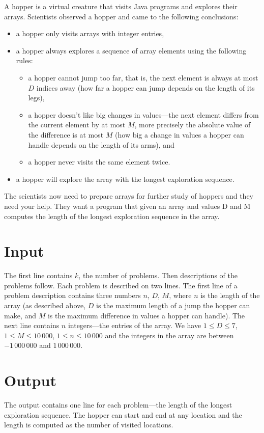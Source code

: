 
A hopper is a virtual creature that visits Java programs and explores their arrays. Scientists
observed a hopper and came to the following conclusions:
\begin{itemize}
\item a hopper only visits arrays with integer entries, 
\item a hopper always explores a sequence of array elements using the
  following rules:
  \begin{itemize}
  \item a hopper cannot jump too far, that is, the next element is
    always at most $D$ indices away (how far a hopper can jump depends
    on the length of its legs),
  \item a hopper doesn’t like big changes in values---the next element
    differs from the current element by at most $M$, more precisely
    the absolute value of the difference is at most $M$ (how big a
    change in values a hopper can handle depends on the length of its
    arms), and
  \item a hopper never visits the same element twice.
  \end{itemize}
\item a hopper will explore the array with the longest exploration
  sequence.
\end{itemize}
The scientists now need to prepare arrays for further study of hoppers and they need your
help. They want a program that given an array and values D and M computes the length
of the longest exploration sequence in the array.

\section*{Input}

The first line contains $k$, the number of problems. Then descriptions
of the problems follow.  Each problem is described on two lines. The
first line of a problem description contains three numbers $n$, $D$,
$M$, where $n$ is the length of the array (as described above, $D$ is
the maximum length of a jump the hopper can make, and $M$ is the
maximum difference in values a hopper can handle). The next line
contains $n$ integers---the entries of the array. We have
$1 \leq D \leq 7$, $1 \leq M \leq 10\,000$, $1 \leq n \leq 10\,000$
and the integers in the array are between $-1\,000\,000$ and
$1\,000\,000$.

\section*{Output}

The output contains one line for each problem—the length of the
longest exploration sequence. The hopper can start and end at any
location and the length is computed as the number of visited
locations.
